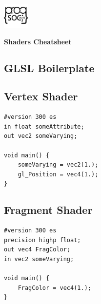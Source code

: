 \documentclass{article}
\begin{document}
    \begin{landscape}
        \includegraphics[height=1.3cm]{progsoc.png}

        \vspace{-1.3cm}

        \begin{center}
            \begin{LARGE}
                \textbf{Shaders Cheatsheet}
            \end{LARGE}
        \end{center}
        \begin{multicols}{3}

            \section{GLSL Boilerplate}
            \subsection{Vertex Shader}
            \begin{verbatim}
#version 300 es
in float someAttribute;
out vec2 someVarying;

void main() {
    someVarying = vec2(1.);
    gl_Position = vec4(1.);
}
            \end{verbatim}

            \subsection{Fragment Shader}
            \begin{verbatim}
#version 300 es
precision highp float;
out vec4 FragColor;
in vec2 someVarying;

void main() {
    FragColor = vec4(1.);
}
            \end{verbatim}


\end{multicols}
\end{landscape}
\end{document}
